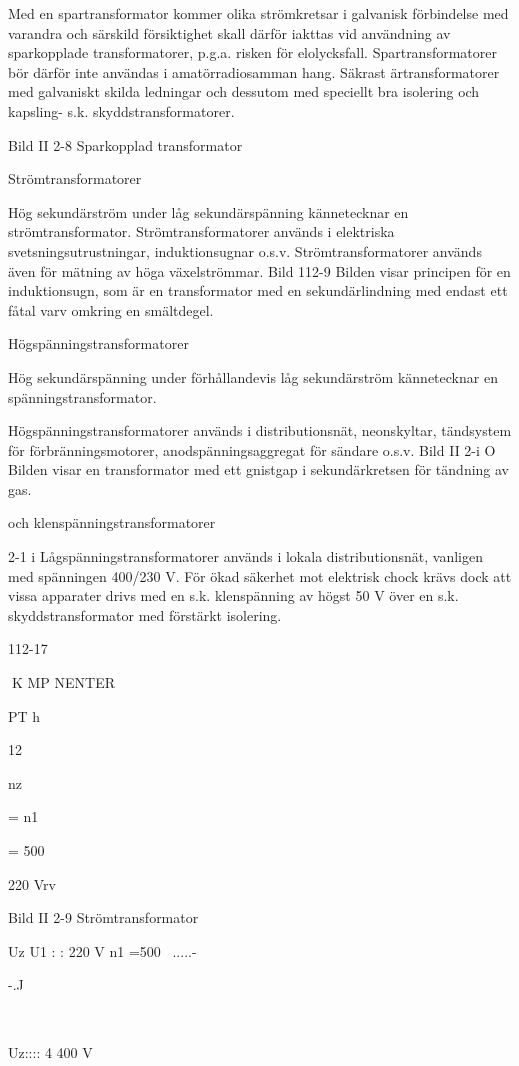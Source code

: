 {Med en spartransformator kommer olika
strömkretsar i galvanisk förbindelse med
varandra och särskild försiktighet skall därför iakttas vid användning av sparkopplade
transformatorer, p.g.a. risken för elolycksfall. Spartransformatorer bör därför inte användas i amatörradiosamman hang. Säkrast
ärtransformatorer med galvaniskt skilda ledningar och dessutom med speciellt bra isolering och kapsling- s.k. skyddstransformatorer.

Bild II 2-8 Sparkopplad transformator

Strömtransformatorer

Hög sekundärström under låg sekundärspänning kännetecknar en strömtransformator.
Strömtransformatorer används i elektriska svetsningsutrustningar, induktionsugnar
o.s.v. Strömtransformatorer används även
för mätning av höga växelströmmar.
Bild 112-9
Bilden visar principen för en induktionsugn, som är en transformator med en sekundärlindning med endast ett fåtal varv omkring en smältdegel.

Högspänningstransformatorer

Hög sekundärspänning under förhållandevis låg sekundärström kännetecknar en
spänningstransformator.

Högspänningstransformatorer används i
distributionsnät, neonskyltar, tändsystem för
förbränningsmotorer, anodspänningsaggregat för sändare o.s.v.
Bild II 2-i O
Bilden visar en transformator med ett gnistgap i sekundärkretsen för tändning av gas.

och klenspänningstransformatorer

2-1 i
Lågspänningstransformatorer används i lokala distributionsnät, vanligen med spänningen 400/230 V. För ökad säkerhet mot
elektrisk chock krävs dock att vissa apparater drivs med en s.k. klenspänning av högst
50 V över en s.k. skyddstransformator med
förstärkt isolering.

112-17

K MP NENTER

PT
h

12

nz

= n1

= 500

220 Vrv

Bild II 2-9 Strömtransformator

Uz
U1 : : 220 V
n1 =500 ~.....-   

-.J

~

Uz:::: 4 400 V

}
